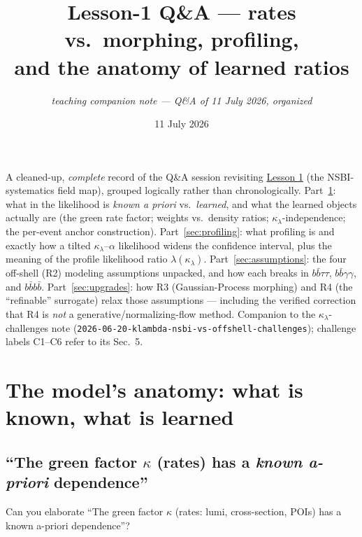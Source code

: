 \documentclass[11pt]{article}
\title{\vspace{-2.5em}Lesson-1 Q\&A --- rates vs.\ morphing, profiling,\\
and the anatomy of learned ratios}
\author{\normalsize\itshape teaching companion note --- Q\&A of 11 July 2026, organized}
\date{11 July 2026}
\newcommand{\kl}{\ensuremath{\kappa_\lambda}}
\newcommand{\bbtt}{\ensuremath{b\bar b\tau\tau}}
\newcommand{\bbgg}{\ensuremath{b\bar b\gamma\gamma}}
\newcommand{\fourb}{\ensuremath{b\bar bb\bar b}}
\begin{document}
\maketitle
\vspace{-1.6em}

\begin{takeaway}
A cleaned-up, \emph{complete} record of the Q\&A session revisiting
\href{../lessons/0001-nsbi-systematics-field-map.html}{Lesson 1} (the NSBI-systematics field map), grouped
logically rather than chronologically. Part~\ref{sec:anatomy}: what in the likelihood is \emph{known a priori}
vs.\ \emph{learned}, and what the learned objects actually are (the green rate factor; weights vs.\ density
ratios; \kl-independence; the per-event anchor construction). Part~\ref{sec:profiling}: what profiling is and
exactly how a tilted \kl--$\alpha$ likelihood widens the confidence interval, plus the meaning of the profile
likelihood ratio $\lambda(\kl)$. Part~\ref{sec:assumptions}: the four off-shell (R2) modeling assumptions
unpacked, and how each breaks in \bbtt, \bbgg, and \fourb. Part~\ref{sec:upgrades}: how R3 (Gaussian-Process
morphing) and R4 (the ``refinable'' surrogate) relax those assumptions --- including the verified correction that
R4 is \emph{not} a generative/normalizing-flow method. Companion to the \kl-challenges note
(\texttt{2026-06-20-klambda-nsbi-vs-offshell-challenges}); challenge labels C1--C6 refer to its Sec.~5.
\end{takeaway}

\tableofcontents

\section{The model's anatomy: what is known, what is learned}\label{sec:anatomy}

\subsection{``The green factor $\kappa$ (rates) has a \emph{known a-priori} dependence''}\label{sec:green}

\begin{qbox}[Question]
Can you elaborate ``The green factor $\kappa$ (rates: lumi, cross-section, POIs) has a known a-priori
dependence''?
\end{qbox}
\end{document}
